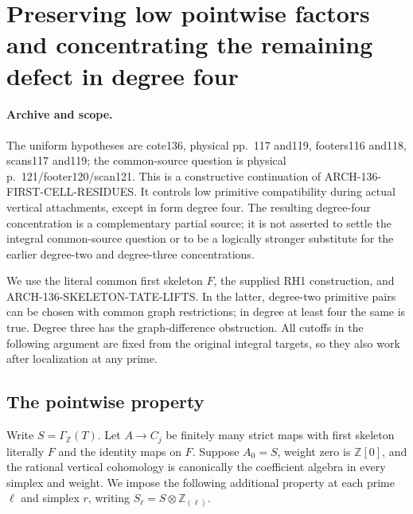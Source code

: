 \section{Preserving low pointwise factors and concentrating the remaining defect in degree four}
\label{sec:136-low-factor-preservation}

\paragraph{Archive and scope.}
The uniform hypotheses are cote136, physical pp.~117 and119,
footers116 and118, scans117 and119; the common-source question
is physical p.~121/footer120/scan121. This is a constructive
continuation of ARCH-136-FIRST-CELL-RESIDUES. It controls low
primitive compatibility during actual vertical attachments,
except in form degree four. The resulting degree-four
concentration is a complementary partial source; it is not
asserted to settle the integral common-source question or to
be a logically stronger substitute for the earlier degree-two
and degree-three concentrations.

We use the literal common first skeleton \(F\), the supplied
RH1 construction, and ARCH-136-SKELETON-TATE-LIFTS. In the
latter, degree-two primitive pairs can be chosen with common
graph restrictions; in degree at least four the same is true.
Degree three has the graph-difference obstruction. All cutoffs
in the following argument are fixed from the original integral
targets, so they also work after localization at any prime.

\subsection{The pointwise property}

Write \(S=\Gamma_{\mathbb Z}(T)\). Let \(A\to C_j\)
be finitely many strict maps with first skeleton literally \(F\)
and the identity maps on \(F\). Suppose \(A_0=S\), weight
zero is \(\mathbb Z[0]\), and the rational vertical
cohomology is canonically the coefficient algebra in every
simplex and weight. We impose the following additional property
at each prime \(\ell\) and simplex \(r\), writing
\(S_\ell=S\otimes\mathbb Z_{(\ell)}\).

